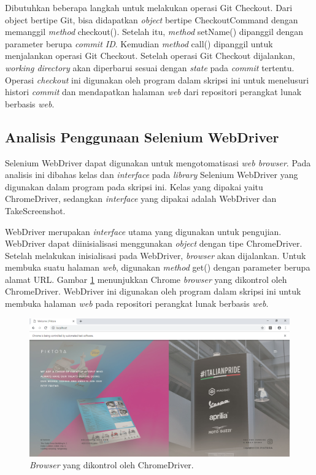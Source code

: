 Dibutuhkan beberapa langkah untuk melakukan operasi Git Checkout. Dari object bertipe Git, bisa  didapatkan \textit{object} bertipe CheckoutCommand dengan memanggil \textit{method} checkout(). Setelah itu, \textit{method} setName() dipanggil dengan parameter berupa \textit{commit ID}. Kemudian \textit{method} call() dipanggil untuk menjalankan operasi Git Checkout. Setelah operasi Git Checkout dijalankan, \textit{working directory} akan diperbarui sesuai dengan \textit{state} pada \textit{commit} tertentu. Operasi \textit{checkout} ini digunakan oleh program dalam skripsi ini untuk menelusuri histori \textit{commit} dan mendapatkan halaman \textit{web} dari repositori perangkat lunak berbasis \textit{web}.    


\subsection{Analisis Penggunaan Selenium WebDriver}
\label{subsec:analisis_selenium}
Selenium WebDriver dapat digunakan untuk mengotomatisasi \textit{web browser}. Pada analisis ini dibahas kelas dan \textit{interface} pada \textit{library} Selenium WebDriver yang digunakan dalam program pada skripsi ini. 
Kelas yang dipakai yaitu ChromeDriver, sedangkan \textit{interface} yang dipakai adalah WebDriver dan TakeScreenshot. 


WebDriver merupakan \textit{interface} utama yang digunakan untuk pengujian. WebDriver dapat diinisialisasi menggunakan \textit{object} dengan tipe ChromeDriver. Setelah melakukan inisialisasi pada WebDriver, \textit{browser} akan dijalankan. Untuk membuka suatu halaman \textit{web}, digunakan \textit{method} get() dengan parameter berupa alamat URL. Gambar \ref{fig:webdriver} menunjukkan Chrome \textit{browser} yang dikontrol oleh ChromeDriver. WebDriver ini digunakan oleh program dalam skripsi ini untuk membuka halaman \textit{web} pada repositori perangkat lunak berbasis \textit{web}. 

\begin{figure}[H]
	\centering
		\includegraphics[scale=0.4]{Gambar/ChromeDriver.png}
	\caption{\textit{Browser} yang dikontrol oleh ChromeDriver.}
	\label{fig:webdriver}
\end{figure}


